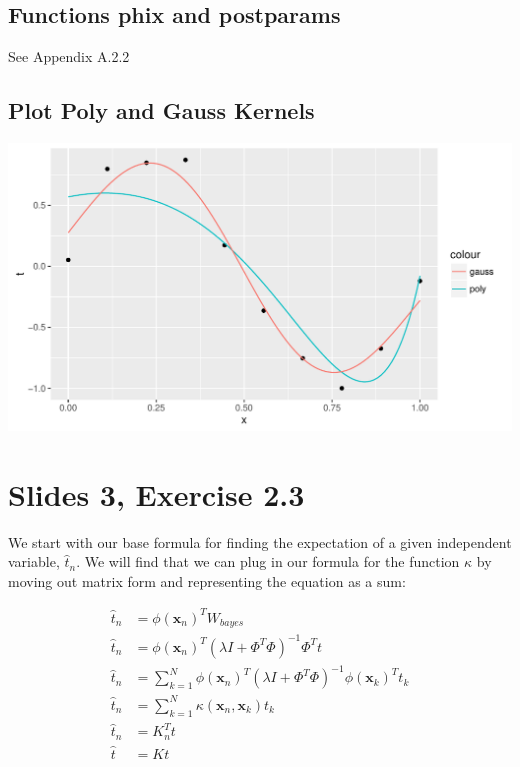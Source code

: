 \documentclass[a4paper,12pt]{article}\usepackage[]{graphicx}\usepackage[]{color}
\makeatletter
\def\maxwidth{ %
  \ifdim\Gin@nat@width>\linewidth
    \linewidth
  \else
    \Gin@nat@width
  \fi
}
\newenvironment{knitrout}{}{} %
\makeatother
\begin{document}
\subsection{ Functions phix and postparams }

See Appendix A.2.2

\subsection{ Plot Poly and Gauss Kernels }

\begin{knitrout}
\color{fgcolor}
\includegraphics[width=\maxwidth]{figure/plot_curve_fitting-1} 

\end{knitrout}


\section{Slides 3, Exercise 2.3}

We start with our base formula for finding the expectation of a given independent variable, $\hat{t}_n$. We will find that we can plug in our formula for the function $\kappa$ by moving out matrix form and representing the equation as a sum:

\begin{align*}
\hat{t}_n &= \phi(\bm{x}_n)^T W_{bayes} \\
\hat{t}_n &= \phi(\bm{x}_n)^T(\lambda I + \Phi^T\Phi)^{-1}\Phi^Tt \\
\hat{t}_n &= \sum_{k=1}^{N}\phi(\bm{x}_n)^T(\lambda I + \Phi^T\Phi)^{-1}\phi(\bm{x}_k)^Tt_k \\
\hat{t}_n &= \sum_{k=1}^{N} \kappa (\bm{x}_n, \bm{x}_k)t_k \\
\hat{t}_n &= K_n^Tt \\
\hat{t} &= Kt
\end{align*}
\end{document}
